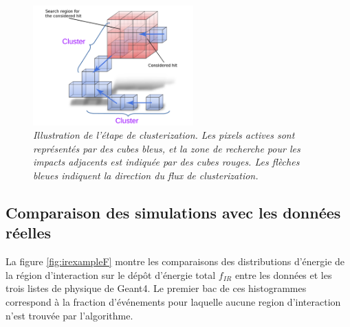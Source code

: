 \begin{figure}
	\centering
	\includegraphics[width=0.55\textwidth]{ECAL/graphics/demo-v3.pdf}
	\caption{\label{fig:democlusterF} \sl Illustration de l'étape de clusterization. Les pixels actives sont représentés par des cubes bleus, et la zone de recherche pour les impacts adjacents est indiquée par des cubes rouges. Les flèches bleues indiquent la direction du flux de clusterization.}
\end{figure}

\newpage
\subsection*{Comparaison des simulations avec les données réelles}


La figure \ref{fig:irexampleF} montre les comparaisons des distributions d'énergie de la région d'interaction sur le dépôt d'énergie total $f_ {IR}$ entre les données et les trois listes de physique de {\sc Geant4}.
Le premier bac de ces histogrammes correspond à la fraction d'événements pour laquelle aucune region d'interaction n'est trouvée par l'algorithme.


